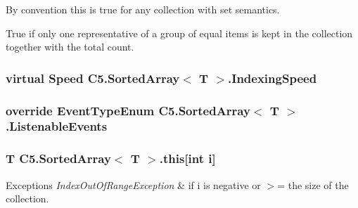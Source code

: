 By convention this is true for any collection with set semantics. 

True if only one representative of a group of equal items is kept in the collection together with the total count.\hypertarget{class_c5_1_1_sorted_array_a6ad98d9992727f175b9a5f236051fa87}{}
\subsubsection[{Indexing\+Speed}]{\setlength{\rightskip}{0pt plus 5cm}virtual {\bf Speed} {\bf C5.\+Sorted\+Array}$<$ T $>$.Indexing\+Speed\hspace{0.3cm}{\ttfamily [get]}}\label{class_c5_1_1_sorted_array_a6ad98d9992727f175b9a5f236051fa87}




\hypertarget{class_c5_1_1_sorted_array_a82cc744cd98af8f797e1e61e3f511091}{}
\subsubsection[{Listenable\+Events}]{\setlength{\rightskip}{0pt plus 5cm}override {\bf Event\+Type\+Enum} {\bf C5.\+Sorted\+Array}$<$ T $>$.Listenable\+Events\hspace{0.3cm}{\ttfamily [get]}}\label{class_c5_1_1_sorted_array_a82cc744cd98af8f797e1e61e3f511091}




\hypertarget{class_c5_1_1_sorted_array_a74311d95d2d99a2f39d62d4daa3d3fe9}{}
\subsubsection[{this[int i]}]{\setlength{\rightskip}{0pt plus 5cm}T {\bf C5.\+Sorted\+Array}$<$ T $>$.this\mbox{[}int i\mbox{]}\hspace{0.3cm}{\ttfamily [get]}}\label{class_c5_1_1_sorted_array_a74311d95d2d99a2f39d62d4daa3d3fe9}



\begin{DoxyExceptions}{Exceptions}
{\em Index\+Out\+Of\+Range\+Exception} & if i is negative or $>$= the size of the collection. \\
\hline
\end{DoxyExceptions}


